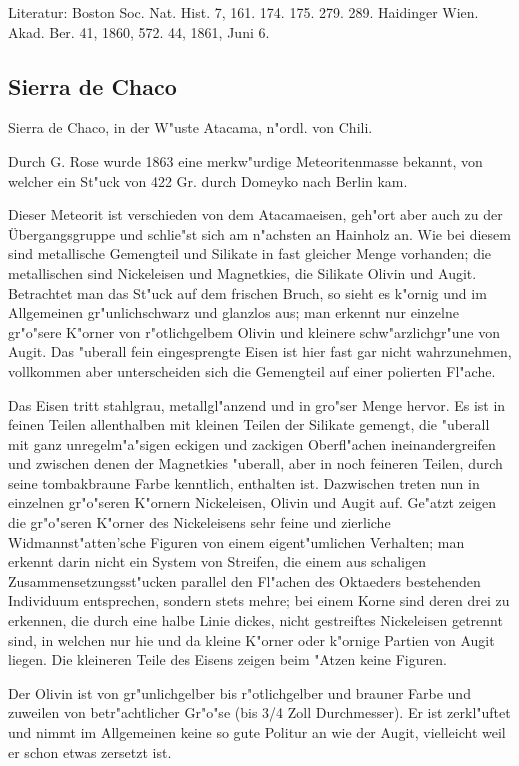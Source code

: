 \documentclass[a4paper, 11pt, oneside]{article}
\begin{document}
Literatur: Boston Soc. Nat. Hist. 7, 161. 174. 175. 279. 289. Haidinger Wien. Akad. Ber. 41, 1860, 572. 44, 1861, Juni 6.

\subsection{Sierra de Chaco}

Sierra de Chaco, in der W"uste Atacama, n"ordl. von Chili.

Durch G. Rose wurde 1863 eine merkw"urdige Meteoritenmasse bekannt, von welcher ein St"uck von 422 Gr. durch Domeyko nach Berlin kam.

Dieser Meteorit ist verschieden von dem Atacamaeisen, geh"ort aber auch zu der Übergangsgruppe und schlie"st sich am n"achsten an Hainholz an. Wie bei diesem sind metallische Gemengteil und Silikate in fast gleicher Menge vorhanden; die metallischen sind Nickeleisen und Magnetkies, die Silikate Olivin und Augit. Betrachtet man das St"uck auf dem frischen Bruch, so sieht es k"ornig und im Allgemeinen gr"unlichschwarz und glanzlos aus; man erkennt nur einzelne gr"o"sere K"orner von r"otlichgelbem Olivin und kleinere schw"arzlichgr"une von Augit. Das "uberall fein eingesprengte Eisen ist hier fast gar nicht wahrzunehmen, vollkommen aber unterscheiden sich die Gemengteil auf einer polierten Fl"ache.

Das Eisen tritt stahlgrau, metallgl"anzend und in gro"ser Menge hervor. Es ist in feinen Teilen allenthalben mit kleinen Teilen der Silikate gemengt, die "uberall mit ganz unregelm"a"sigen eckigen und zackigen Oberfl"achen ineinandergreifen und zwischen denen der Magnetkies "uberall, aber in noch feineren Teilen, durch seine tombakbraune Farbe kenntlich, enthalten ist. Dazwischen treten nun in einzelnen gr"o"seren K"ornern Nickeleisen, Olivin und Augit auf. Ge"atzt zeigen die gr"o"seren K"orner des Nickeleisens sehr feine und zierliche Widmannst"atten'sche Figuren von einem eigent"umlichen Verhalten; man erkennt darin nicht ein System von Streifen, die einem aus schaligen Zusammensetzungsst"ucken parallel den Fl"achen des Oktaeders bestehenden Individuum entsprechen, sondern stets mehre; bei einem Korne sind deren drei zu erkennen, die durch eine halbe Linie dickes, nicht gestreiftes Nickeleisen getrennt sind, in welchen nur hie und da kleine K"orner oder k"ornige Partien von Augit liegen. Die kleineren Teile des Eisens zeigen beim "Atzen keine Figuren.

Der Olivin ist von gr"unlichgelber bis r"otlichgelber und brauner Farbe und zuweilen von betr"achtlicher Gr"o"se (bis 3/4 Zoll Durchmesser). Er ist zerkl"uftet und nimmt im Allgemeinen keine so gute Politur an wie der Augit, vielleicht weil er schon etwas zersetzt ist.
\end{document}
